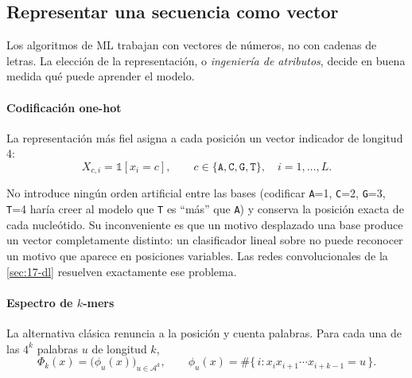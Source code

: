 \subsection{Representar una secuencia como vector}

Los algoritmos de ML trabajan con vectores de números, no con cadenas de letras. La elección de la representación, o \emph{ingeniería de atributos}, decide en buena medida qué puede aprender el modelo.

\paragraph{Codificación one-hot} La representación más fiel asigna a cada posición un vector indicador de longitud 4:
\begin{equation}\label{eq:17-onehot}
X_{c,i} = \mathbb{1}\left[x_i = c\right],\qquad c\in\{\texttt{A},\texttt{C},\texttt{G},\texttt{T}\},\quad i=1,\dots,L.
\end{equation}

\begin{simbolos}
\end{simbolos}

No introduce ningún orden artificial entre las bases (codificar \texttt{A}=1, \texttt{C}=2, \texttt{G}=3, \texttt{T}=4 haría creer al modelo que \texttt{T} es ``más'' que \texttt{A}) y conserva la posición exacta de cada nucleótido. Su inconveniente es que un motivo desplazado una base produce un vector completamente distinto: un clasificador lineal sobre  no puede reconocer un motivo que aparece en posiciones variables. Las redes convolucionales de la \cref{sec:17-dl} resuelven exactamente ese problema.

\paragraph{Espectro de $k$-mers} La alternativa clásica renuncia a la posición y cuenta palabras. Para cada una de las $4^k$ palabras $u$ de longitud $k$,
\begin{equation}\label{eq:17-espectro}
\Phi_k(x) = \big(\phi_u(x)\big)_{u\in\mathcal{A}^k},\qquad \phi_u(x) = \#\{\,i : x_{i}x_{i+1}\cdots x_{i+k-1} = u\,\}.
\end{equation}

\begin{simbolos}
\end{simbolos}


